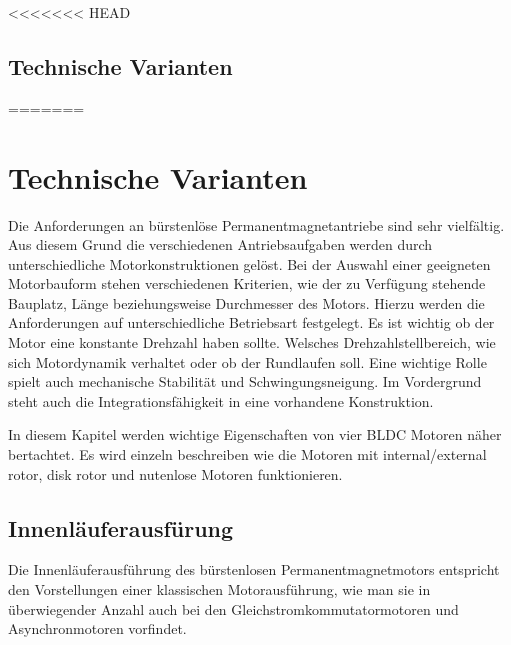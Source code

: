 <<<<<<< HEAD
\section{Technische Varianten}
=======
\chapter{Technische Varianten}
Die Anforderungen an bürstenlöse Permanentmagnetantriebe sind sehr vielfältig. Aus diesem Grund die verschiedenen Antriebsaufgaben werden durch unterschiedliche Motorkonstruktionen gelöst.
Bei der Auswahl einer geeigneten Motorbauform stehen verschiedenen Kriterien, wie der zu Verfügung stehende Bauplatz, Länge beziehungsweise Durchmesser des Motors. Hierzu werden die Anforderungen auf unterschiedliche Betriebsart festgelegt. Es ist wichtig ob der Motor eine konstante Drehzahl haben sollte. Welsches Drehzahlstellbereich, wie sich Motordynamik verhaltet oder ob der Rundlaufen soll. Eine wichtige Rolle spielt auch mechanische Stabilität und Schwingungsneigung. Im Vordergrund steht auch die Integrationsfähigkeit in eine vorhandene Konstruktion.\parencite[S. 74]{Stölting2011}

In diesem Kapitel werden wichtige Eigenschaften von vier BLDC Motoren näher bertachtet. Es wird einzeln beschreiben wie die Motoren mit internal/external rotor, disk rotor und nutenlose Motoren funktionieren.
\section{Innenläuferausfürung}
Die Innenläuferausführung des bürstenlosen Permanentmagnetmotors entspricht den Vorstellungen einer klassischen Motorausführung, wie man sie in überwiegender Anzahl auch bei den Gleichstromkommutatormotoren und Asynchronmotoren vorfindet.

